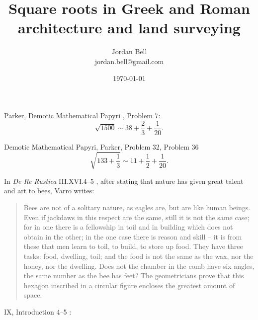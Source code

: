 \documentclass{article}
\theoremstyle{definition}
\begin{document}
\title{Square roots in Greek and Roman architecture and land surveying}
\author{Jordan Bell\\
jordan.bell@gmail.com}
\date{\today}

\maketitle

Parker, Demotic Mathematical Papyri \cite{DMP}, Problem 7:
\[
\sqrt{1500} \sim 38+\frac{2}{3}+\frac{1}{20}.
\]

Demotic Mathematical Papyri, Parker, Problem 32, Problem 36
\[
\sqrt{133+\frac{1}{3}} \sim 11+\frac{1}{2}+\frac{1}{20}.
\]

In {\em De Re Rustica} III.XVI.4--5 \cite[p.~501]{varro}, after stating that nature has given great talent and art to bees, Varro writes:
 
\begin{quote}
Bees are not of a solitary nature, as eagles are, but are like human beings. Even if jackdaws in this respect are the same, still it is not the same case; for in one there is a fellowship
in toil and in building which does not obtain in the other; in the one case there is reason and skill -- it is from these that men learn to toil, to build, to store up food. They have three 
tasks: food, dwelling, toil; and the food is not the same as the wax, nor the honey, nor the dwelling. Does not the chamber in the comb have six angles, the same number as the bee 
has feet? The geometricians prove that this hexagon inscribed in a circular figure encloses the greatest amount of space.
\end{quote}

IX, Introduction 4--5 \cite[p.~243]{vitruvius}:
\end{document}
